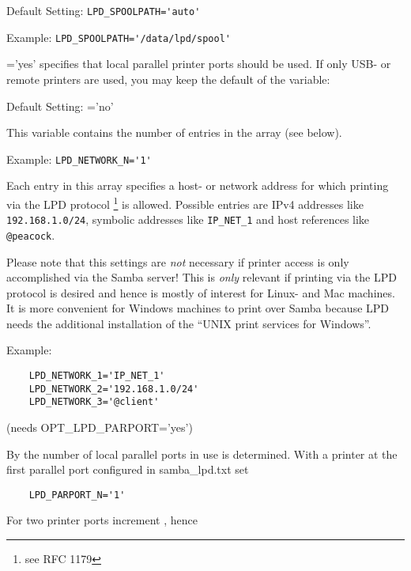 \begin{description}
  Default Setting: \verb+LPD_SPOOLPATH='auto'+

  Example: \verb+LPD_SPOOLPATH='/data/lpd/spool'+


  ='yes' specifies that local parallel printer
  ports should be used. If only USB- or remote printers are used,
  you may keep the default of the variable:

  Default Setting: ='no'


  This variable contains the number of entries in the array
   (see below).

  Example: \verb+LPD_NETWORK_N='1'+


  Each entry in this array specifies a host- or network address for which
  printing via the LPD protocol \footnote{see RFC 1179} is allowed. Possible
  entries are IPv4 addresses like \verb+192.168.1.0/24+, symbolic addresses
  like \verb+IP_NET_1+ and host references like \verb+@peacock+.

  Please note that this settings are \emph{not} necessary if printer access
  is only accomplished via the Samba server! This is \emph{only} relevant if printing
  via the LPD protocol is desired and hence is mostly of interest for Linux- and Mac
  machines. It is more convenient for Windows machines to print over Samba because
  LPD needs the additional installation of the ``UNIX print services for Windows''.

  Example:
\begin{example}
\begin{verbatim}
    LPD_NETWORK_1='IP_NET_1'
    LPD_NETWORK_2='192.168.1.0/24'
    LPD_NETWORK_3='@client'
\end{verbatim}
\end{example}

 (needs OPT\_LPD\_PARPORT='yes')

  By  the number of local parallel ports in use
  is determined. With a printer at the first parallel port configured in
  samba\_lpd.txt set

\begin{example}
\begin{verbatim}
    LPD_PARPORT_N='1'
\end{verbatim}
\end{example}
  For two printer ports increment ,
  hence


\end{description}
